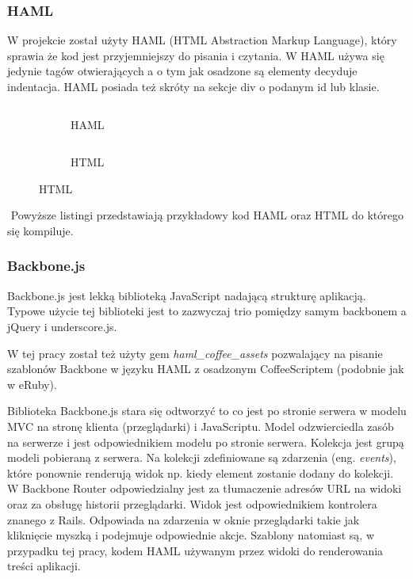 \documentclass[11pt,a4paper, twoside]{article}
\begin{document}
\subsubsection{HAML}
W projekcie został użyty HAML (HTML Abstraction Markup Language), który sprawia że kod jest przyjemniejszy do pisania i czytania. W HAML używa się jedynie tagów otwierających a o tym jak osadzone są elementy decyduje indentacja. HAML posiada też skróty na sekcje div o podanym id lub klasie.
\begin{figure}[H]
\centering
\begin{subfigure}[t]{0.45\textwidth}
\caption{HAML}
\begin{listing}[H]
\inputminted[linenos=true]{haml}{./src/example.haml}
\end{listing}
\end{subfigure}
\begin{subfigure}[t]{0.45\textwidth}
\caption{HTML}
\begin{listing}[H]
\inputminted{html}{./src/example.html}
\end{listing}
\end{subfigure}
\end{figure}
$\label{haml}$
Powyższe listingi przedstawiają przykładowy kod HAML oraz HTML do którego się kompiluje.
\subsubsection{Backbone.js}
Backbone.js jest lekką biblioteką JavaScript nadającą strukturę aplikacją. Typowe użycie tej biblioteki jest to zazwyczaj trio pomiędzy samym backbonem a jQuery i underscore.js.

W tej pracy został też użyty gem \emph{haml\_coffee\_assets} pozwalający na pisanie szablonów Backbone w języku HAML z osadzonym CoffeeScriptem (podobnie jak w eRuby). 

Biblioteka Backbone.js stara się odtworzyć to co jest po stronie serwera w modelu MVC na stronę klienta (przeglądarki) i JavaScriptu. Model odzwierciedla zasób na serwerze i jest odpowiednikiem modelu po stronie serwera. Kolekcja jest grupą modeli pobieraną z serwera. Na kolekcji zdefiniowane są zdarzenia (eng. \emph{events}), które ponownie renderują widok np. kiedy element zostanie dodany do kolekcji. W Backbone Router odpowiedzialny jest za tłumaczenie adresów URL na widoki oraz za obsługę historii przeglądarki. Widok jest odpowiednikiem kontrolera znanego z Rails. Odpowiada na zdarzenia w oknie przeglądarki takie jak kliknięcie myszką i podejmuje odpowiednie akcje. Szablony natomiast są, w przypadku tej pracy, kodem HAML używanym przez widoki do renderowania treści aplikacji.
\end{document}
